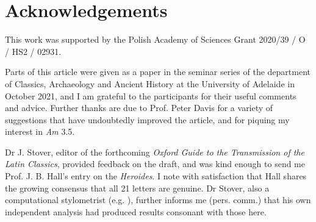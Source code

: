 \documentclass[twocolumn, switch, a4paper]{article} %
\begin{document}
\footnotesize
\section*{Acknowledgements}

This work was supported by the Polish Academy of Sciences Grant 2020/39 / O /
HS2 / 02931.

Parts of this article were given as a paper in the seminar series of the
department of Classics, Archaeology and Ancient History at the University of
Adelaide in October 2021, and I am grateful to the participants for their useful
comments and advice. Further thanks are due to Prof. Peter Davis for a variety
of suggestions that have undoubtedly improved the article, and for piquing my
interest in \emph{Am} 3.5.

Dr J. Stover, editor of the forthcoming \emph{Oxford Guide to the Transmission
of the Latin Classics}, provided feedback on the draft, and was kind enough to
send me Prof. J. B. Hall's entry on the \emph{Heroides}. I note with
satisfaction that Hall shares the growing consensus that all 21 letters are
genuine. Dr Stover, also a computational stylometrist (e.g.
), further informs me (pers. comm.) that his own
independent analysis had produced results consonant with those here.

\FloatBarrier
\normalsize
\singlespacing



\end{document}
